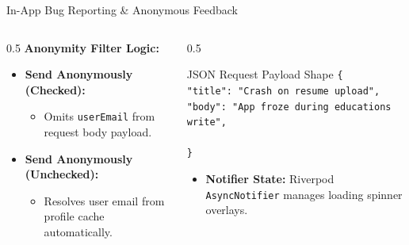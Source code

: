 \documentclass[10pt]{beamer}
\begin{document}
\begin{frame}{In-App Bug Reporting \& Anonymous Feedback}
    \begin{columns}
        \begin{column}{0.5\textwidth}
            \textbf{Anonymity Filter Logic:}
            \begin{itemize}
                \item \textbf{Send Anonymously (Checked):}
                \begin{itemize}
                    \item Omits \texttt{userEmail} from request body payload.
                \end{itemize}
                \item \textbf{Send Anonymously (Unchecked):}
                \begin{itemize}
                    \item Resolves user email from profile cache automatically.
                \end{itemize}
            \end{itemize}
        \end{column}
        \begin{column}{0.5\textwidth}
            \begin{block}{JSON Request Payload Shape}
                \texttt{\{\\
                \quad "title": "Crash on resume upload",\\
                \quad "body": "App froze during educations write",\\
                \quad \color{accentred}{"userEmail": "user@domain.com" // (Optional)}\\
                \}}
            \end{block}
            \begin{itemize}
                \item \textbf{Notifier State:} Riverpod \texttt{AsyncNotifier} manages loading spinner overlays.
            \end{itemize}
        \end{column}
    \end{columns}
\end{frame}
\end{document}
